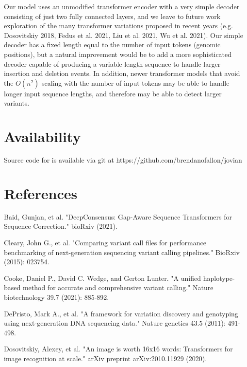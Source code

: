 \documentclass[]{article}
\begin{document}
Our model uses an unmodified transformer encoder with a very simple decoder consisting of just two fully connected layers, and we leave to future work exploration of the many transformer variations proposed in recent years (e.g. Dosovitskiy 2018, Fedus et al. 2021, Liu et al. 2021, Wu et al. 2021). Our simple decoder has a fixed length equal to the number of input tokens (genomic positions), but a natural improvement would be to add a more sophisticated decoder capable of producing a variable length sequence to handle larger insertion and deletion events.  In addition, newer transformer models that avoid the $O(n^2)$ scaling with the number of input tokens may be able to handle longer input sequence lengths, and therefore may be able to detect larger variants. 


\section{Availability}
 
 Source code for is available via git at https://github.com/brendanofallon/jovian
 
\section{References}

\vspace{8pt}
Baid, Gunjan, et al. "DeepConsensus: Gap-Aware Sequence Transformers for Sequence Correction." bioRxiv (2021).

\vspace{8pt}
Cleary, John G., et al. "Comparing variant call files for performance benchmarking of next-generation sequencing variant calling pipelines." BioRxiv (2015): 023754.

\vspace{8pt}
Cooke, Daniel P., David C. Wedge, and Gerton Lunter. "A unified haplotype-based method for accurate and comprehensive variant calling." Nature biotechnology 39.7 (2021): 885-892.

\vspace{8pt}
DePristo, Mark A., et al. "A framework for variation discovery and genotyping using next-generation DNA sequencing data." Nature genetics 43.5 (2011): 491-498.
 
\vspace{8pt}
Dosovitskiy, Alexey, et al. "An image is worth 16x16 words: Transformers for image recognition at scale." arXiv preprint arXiv:2010.11929 (2020).
\end{document}
